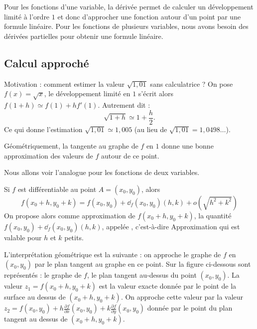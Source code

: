 \documentclass[12pt, class=report,crop=false]{standalone}
\begin{document}
Pour les fonctions d'une variable, la dérivée permet de calculer un développement limité à l'ordre $1$ et donc d'approcher une fonction autour d'un point par une formule linéaire. Pour les fonctions de plusieurs variables, nous avons besoin des dérivées partielles pour obtenir une formule linéaire.

\subsection{Calcul approché}

Motivation : comment estimer la valeur $\sqrt{1,01}$ sans calculatrice ?
On pose $f(x)=\sqrt{x}$, le développement limité en $1$ s'écrit alors
$f(1+h) \simeq f(1) + hf'(1)$. Autrement dit :
$$\sqrt{1+h} \simeq 1 + \frac{h}{2}.$$
Ce qui donne l'estimation  $\sqrt{1,01} \simeq 1,005$ (au lieu de 
$\sqrt{1,01} = 1,0498\ldots$).

Géométriquement, la tangente au graphe de $f$ en $1$ donne une bonne approximation des valeurs de $f$ autour de ce point.

\bigskip

Nous allons voir l'analogue pour les fonctions de deux variables.

Si $f$ est différentiable au point $A = (x_0,y_0)$, alors
$$f(x_0+h,y_0+k) = f(x_0,y_0) + \dd_f(x_0,y_0) (h,k) + o(\sqrt{h^2+k^2})$$
On propose alors comme approximation de $f(x_0+h,y_0+k)$, la quantité 
$f(x_0,y_0) + \dd_f(x_0,y_0) (h,k)$, appelée , c'est-à-dire
Approximation qui est valable pour $h$ et $k$ petits.

L'interprétation géométrique est la suivante : 
on approche le graphe de $f$ en $(x_0,y_0)$ par le plan tangent au graphe en ce point. Sur la figure ci-dessous sont représentés : le graphe de $f$, le plan tangent au-dessus du point $(x_0,y_0)$. La valeur $z_1 = f(x_0+h,y_0+k)$ est la valeur exacte donnée par le point de la surface au dessus de $(x_0+h,y_0+k)$. On approche cette valeur par la valeur $z_2 = f(x_0,y_0) + h\frac{\partial f}{\partial x}(x_0,y_0)
+k\frac{\partial f}{\partial y}(x_0,y_0)$ donnée par le point du plan tangent au dessus de $(x_0+h,y_0+k)$. 


\end{document}
